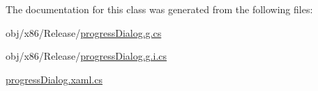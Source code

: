 The documentation for this class was generated from the following files\-:\begin{DoxyCompactItemize}
\item 
obj/x86/\-Release/\hyperlink{progressDialog_8g_8cs}{progress\-Dialog.\-g.\-cs}\item 
obj/x86/\-Release/\hyperlink{progressDialog_8g_8i_8cs}{progress\-Dialog.\-g.\-i.\-cs}\item 
\hyperlink{progressDialog_8xaml_8cs}{progress\-Dialog.\-xaml.\-cs}\end{DoxyCompactItemize}
